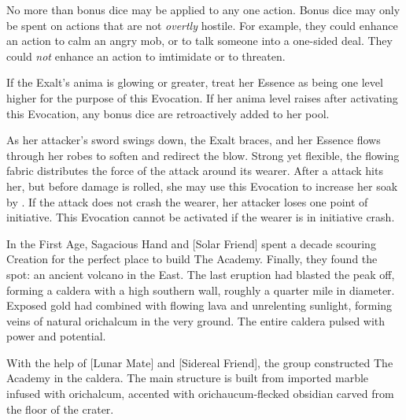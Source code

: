 No more than  bonus dice may be applied to any one action.
Bonus dice may only be spent on actions that are not \emph{overtly} hostile.
For example, they could enhance an action to calm an angry mob, or to talk
someone into a one-sided deal. They could \emph{not} enhance an action to
imtimidate or to threaten.

If the Exalt's anima is glowing or greater, treat her Essence as being one
level higher for the purpose of this Evocation. If her anima level raises after
activating this Evocation, any bonus dice are retroactively added to her pool.


\begin{Possible}

    As her attacker's sword swings down, the Exalt braces, and her Essence
    flows through her robes to soften and redirect the blow. Strong yet
    flexible, the flowing fabric distributes the force of the attack around its
    wearer. After a  attack hits her, but before damage is
    rolled, she may use this Evocation to increase her soak by
    . If the attack does not crash the wearer, her attacker
    loses one point of initiative. This Evocation cannot be activated if the
    wearer is in initiative crash.
\end{Possible}




In the First Age, Sagacious Hand and [Solar Friend] spent a decade scouring
Creation for the perfect place to build The Academy. Finally, they found the
spot: an ancient volcano in the East. The last eruption had blasted the peak
off, forming a caldera with a high southern wall, roughly a quarter mile in
diameter. Exposed gold had combined with flowing lava and unrelenting sunlight,
forming veins of natural orichalcum in the very ground. The entire caldera
pulsed with power and potential.

With the help of [Lunar Mate] and [Sidereal Friend], the group constructed The
Academy in the caldera. The main structure is built from imported marble
infused with orichalcum, accented with orichaucum-flecked obsidian carved from
the floor of the crater.


